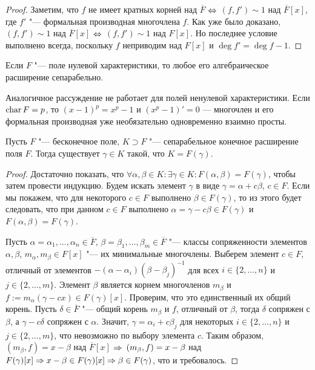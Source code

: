 \begin{proof}
	Заметим, что $f$ не имеет кратных корней над $\overline{F}$ $\Leftrightarrow$ $(f, f') \sim 1$ над $\overline{F}[x]$, где $f'$ "--- формальная производная многочлена $f$. Как уже было доказано, $(f, f') \sim 1$ над $\overline{F}[x]$ $\Leftrightarrow$ $(f, f') \sim 1$ над $F[x]$. Но последнее условие выполнено всегда, поскольку $f$ неприводим над $F[x]$ и $\deg{f'} = \deg{f} - 1$.
\end{proof}

\begin{corollary}
	 Если $F$ "--- поле нулевой характеристики, то любое его алгебраическое расширение сепарабельно.
\end{corollary}

\begin{note}
	Аналогичное рассуждение не работает для полей ненулевой характеристики. Если $\operatorname{char}{F} = p$, то $(x - 1)^p = x^p - 1$ и $(x^p - 1)' = 0$ --- многочлен и его формальная производная уже необязательно одновременно взаимно просты.
\end{note}

\begin{theorem}
	Пусть $F$ "--- бесконечное поле, $K \supset F$ "--- сепарабельное конечное расширение поля $F$. Тогда существует $\gamma \in K$ такой, что $K = F(\gamma)$.
\end{theorem}

\begin{proof}
	Достаточно показать, что $\forall \alpha, \beta \in K: \exists \gamma \in K: F(\alpha, \beta) = F(\gamma)$, чтобы затем провести индукцию. Будем искать элемент $\gamma$ в виде $\gamma = \alpha +c\beta$, $c \in F$. Если мы покажем, что для некоторого $c \in F$ выполнено $\beta \in F(\gamma)$, то из этого будет следовать, что при данном $c \in F$ выполнено $\alpha = \gamma - c\beta \in F(\gamma)$ и $F(\alpha, \beta) = F(\gamma)$.
	
	Пусть $\alpha = \alpha_1, \dotsc, \alpha_n \in \overline{F}$, $\beta = \beta_1, \dotsc, \beta_m \in \overline{F}$ "--- классы сопряженности элементов $\alpha, \beta$, $m_\alpha, m_\beta \in F[x]$ "--- их минимальные многочлены. Выберем элемент $c \in F$, отличный от элементов $-(\alpha - \alpha_i)(\beta - \beta_j)^{-1}$ для всех $i \in \{2, \dotsc, n\}$ и $j \in \{2, \dotsc, m\}$. Элемент $\beta$ является корнем многочленов $m_\beta$ и $f := m_\alpha(\gamma - cx) \in F(\gamma)[x]$. Проверим, что это единственный их общий корень. Пусть $\delta \in \overline{F}$ "--- общий корень $m_\beta$ и $f$, отличный от $\beta$, тогда $\delta$ сопряжен с $\beta$, а $\gamma - c\delta$ сопряжен с $\alpha$. Значит, $\gamma = \alpha_i + c\beta_j$ для некоторых $i \in \{2, \dotsc, n\}$ и $j \in \{2, \dotsc, m\}$, что невозможно по выбору элемента $c$. Таким образом, $(m_\beta, f) = x - \beta$ над $\overline{F}[x]$ $\Rightarrow$ $(m_\beta, f) \hm= x - \beta$ над $F(\gamma)[x] \Rightarrow x - \beta \in F(\gamma)[x] \Rightarrow \beta \in F(\gamma)$, что и требовалось.
\end{proof}


